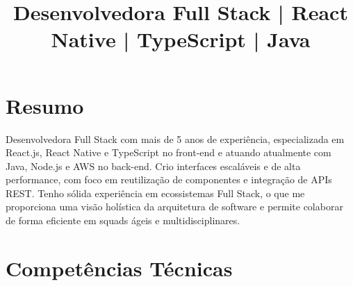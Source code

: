 \documentclass[12pt,a4paper,sans]{moderncv}
\title{\normalsize Desenvolvedora Full Stack | React Native | TypeScript | Java}
\begin{document}
\makecvtitle

\section{Resumo}
{Desenvolvedora Full Stack com mais de 5 anos de experiência, especializada em React.js, React Native e TypeScript no front-end e atuando atualmente com Java, Node.js e AWS no back-end. Crio interfaces escaláveis e de alta performance, com foco em reutilização de componentes e integração de APIs REST. Tenho sólida experiência em ecossistemas Full Stack, o que me proporciona uma visão holística da arquitetura de software e permite colaborar de forma eficiente em squads ágeis e multidisciplinares.}

\section{Competências Técnicas}
\end{document}
